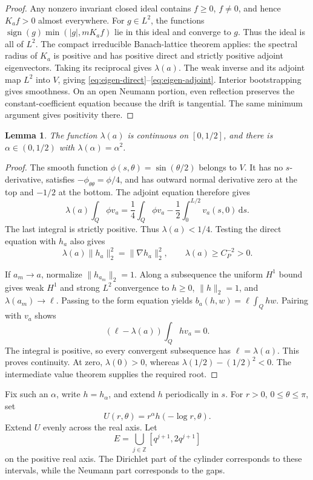 \documentclass[11pt]{article}
\newtheorem{lemma}[theorem]{Lemma}
\newcommand{\dd}{\,\mathrm d}
\begin{document}
\begin{proof}
Any nonzero invariant closed ideal contains \(f\ge0\), \(f\ne0\), and
hence \(K_af>0\) almost everywhere. For \(g\in L^2\), the functions
\(\operatorname{sign}(g)\min(|g|,mK_af)\) lie in this ideal and converge
to \(g\). Thus the ideal is all of \(L^2\).
The compact irreducible Banach-lattice theorem
\cite[Theorem 1.5]{CWW} applies: the spectral radius of \(K_a\) is positive
and has positive direct and strictly positive adjoint eigenvectors.
Taking its reciprocal gives \(\lambda(a)\).
The weak inverse and its adjoint map \(L^2\) into \(V\), giving
\eqref{eq:eigen-direct}--\eqref{eq:eigen-adjoint}.
Interior bootstrapping gives smoothness. On an open Neumann portion, even
reflection preserves the constant-coefficient equation because the drift
is tangential. The same minimum argument gives positivity there.
\end{proof}

\begin{lemma}\label{lem:exponent}
The function \(\lambda(a)\) is continuous on \([0,1/2]\), and there is
\(\alpha\in(0,1/2)\) with \(\lambda(\alpha)=\alpha^2\).
\end{lemma}
\begin{proof}
The smooth function \(\phi(s,\theta)=\sin(\theta/2)\) belongs to \(V\).
It has no \(s\)-derivative, satisfies \(-\phi_{\theta\theta}=\phi/4\),
and has outward normal derivative zero at the top and \(-1/2\) at the
bottom. The adjoint equation therefore gives
\begin{equation}\label{eq:boundary-deficit}
 \lambda(a)\int_Q\phi v_a
 =\frac14\int_Q\phi v_a-\frac12\int_0^{L/2}v_a(s,0)\dd s .
\end{equation}
The last integral is strictly positive. Thus \(\lambda(a)<1/4\).
Testing the direct equation with \(h_a\) also gives
\[
 \lambda(a)\|h_a\|_2^2=\|\nabla h_a\|_2^2,
 \qquad \lambda(a)\ge C_P^{-2}>0 .
\]

If \(a_m\to a\), normalize \(\|h_{a_m}\|_2=1\).
Along a subsequence the uniform \(H^1\) bound gives weak \(H^1\) and strong
\(L^2\) convergence to \(h\ge0\), \(\|h\|_2=1\), and
\(\lambda(a_m)\to\ell\). Passing to the form equation yields
\(b_a(h,w)=\ell\int_Qhw\). Pairing with \(v_a\) shows
\[
 (\ell-\lambda(a))\int_Qhv_a=0 .
\]
The integral is positive, so every convergent subsequence has
\(\ell=\lambda(a)\). This proves continuity.
At zero, \(\lambda(0)>0\), whereas
\(\lambda(1/2)-(1/2)^2<0\). The intermediate value theorem supplies
the required root.
\end{proof}

Fix such an \(\alpha\), write \(h=h_\alpha\), and extend \(h\) periodically
in \(s\). For \(r>0\), \(0\le\theta\le\pi\), set
\begin{equation}\label{eq:mode}
 U(r,\theta)=r^\alpha h(-\log r,\theta).
\end{equation}
Extend \(U\) evenly across the real axis. Let
\[
 E=\bigcup_{j\in\mathbb Z}[q^{j+1},2q^{j+1}]
\]
on the positive real axis. The Dirichlet part of the cylinder corresponds
to these intervals, while the Neumann part corresponds to the gaps.
\end{document}
